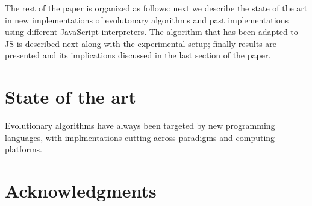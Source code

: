 \documentclass{sig-alternate}
\begin{document}
The rest of the paper is organized as follows: next we describe the
state of the art in new implementations of evolutonary algorithms and
past implementations using different JavaScript interpreters. The
algorithm that has been adapted to JS is described next along with the
experimental setup; finally results are presented and its implications
discussed in the last section of the paper. 

\section{State of the art}
\label{sec:soa}

Evolutionary algorithms have always been targeted by new programming
languages, with implmentations cutting across paradigms and computing
platforms. 


\section{Acknowledgments}


%

\end{document}
